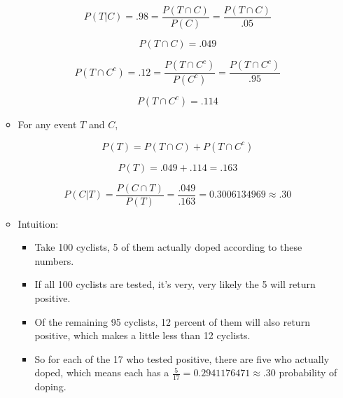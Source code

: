\documentclass[11pt]{article}
\begin{document}
\begin{enumerate}
\begin{itemize}
	\begin{equation*}
		P(T|C) = .98 = \frac{P(T \cap C)}{P(C)} = \frac{P(T \cap C)}{.05}
	\end{equation*}
	
	\begin{equation*}
		P(T \cap C) = .049
	\end{equation*}
	
	\begin{equation*}
	P(T \cap C^c) = .12 = \frac{P(T \cap C^c)}{P(C^c)} = \frac{P(T \cap C^c)}{.95}
	\end{equation*}
	
	\begin{equation*}
		P(T \cap C^c) = .114
	\end{equation*}
	
	\item For any event $T$ and $C$,
	
	\begin{equation*}
		P(T) = P(T \cap C) + P(T \cap C^c) 
	\end{equation*}
	
	\begin{equation*}
		P(T) = .049 + .114 = .163
	\end{equation*}
	
	\begin{equation*}
		P(C|T) = \frac{P(C \cap T)}{P(T)} = \frac{.049}{.163} = 0.3006134969 \approx .30
	\end{equation*}
	
	\item Intuition:
	
	\begin{itemize}
	
		\item Take 100 cyclists, 5 of them actually doped according to these numbers.
		\item If all 100 cyclists are tested, it's very, very likely the 5 will return positive.
		\item Of the remaining 95 cyclists, 12 percent of them will also return positive, which makes a little less than 12 cyclists.
		\item So for each of the 17 who tested positive, there are five who actually doped, which means each has a $\frac{5}{17} = 0.2941176471 \approx .30$ probability of doping.
	
	\end{itemize}

\end{itemize}


\end{enumerate}
\end{document}
